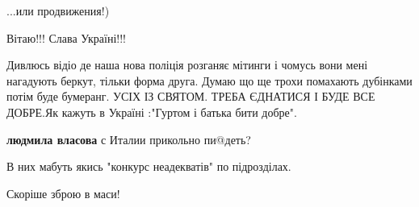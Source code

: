 \begin{itemize}
\begin{itemize}
...или продвижения!)

\end{itemize}

 
Вітаю!!!
Слава Україні!!!

 

Дивлюсь відіо де наша нова поліція розганяє мітинги і чомусь вони мені
нагадують беркут, тільки форма друга. Думаю що ще трохи помахають дубінками
потім буде бумеранг. УСІХ ІЗ СВЯТОМ. ТРЕБА ЄДНАТИСЯ І БУДЕ ВСЕ ДОБРЕ.Як кажуть
в Україні :"Гуртом і батька бити добре".

\begin{itemize}
 
\textbf{людмила власова} с Италии прикольно пи@деть?🤣
\end{itemize}

 
В них мабуть якись "конкурс неадекватів" по підрозділах. \Smiley[1.0][yellow]

 
Скоріше зброю в маси!



\end{itemize}

